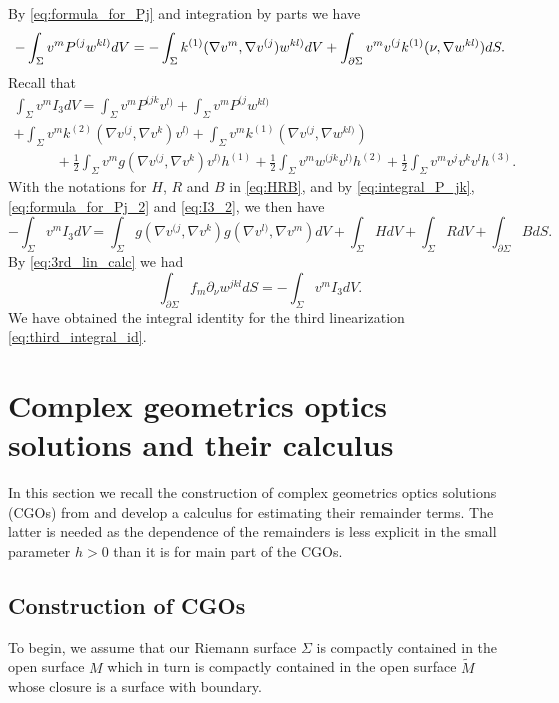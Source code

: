 \documentclass[12pt]{amsart}
\def\p{\partial}
\theoremstyle{definition}
\theoremstyle{remark}
\begin{document}
By \eqref{eq:formula_for_Pj} and integration by parts we have
\begin{equation}\label{eq:formula_for_Pj_2}
 -\int_\Sigma v^m P^{(j}w^{kl)}dV
 =-\int_\Sigma k^{(1)}(\nabla v^m,\nabla v^{(j})w^{kl)}dV \\
 + \int_{\p \Sigma} v^mv^{(j} k^{(1)}(\nu,\nabla w^{kl)})dS.%
\end{equation}
Recall that
\begin{multline}\label{eq:I3_2}
   \int_\Sigma v^m I_3dV= \int_\Sigma v^mP^{(jk}v^{l)}+\int_\Sigma v^m P^{(j}w^{kl)} \\
 	+\int_\Sigma v^mk^{(2)}(\nabla v^{(j},\nabla v^{k})v^{l)}+\int_\Sigma v^mk^{(1)}(\nabla v^{(j},\nabla w^{kl)}) \\
   \qquad\quad+\frac{1}{2}\int_\Sigma v^mg(\nabla v^{(j},\nabla v^{k})v^{l)}h^{(1)} +\frac{1}{2}\int_\Sigma v^mw^{(jk}v^{l)}h^{(2)}+\frac{1}{2}\int_\Sigma v^mv^{j}v^{k}v^{l}h^{(3)}.
\end{multline}
With the notations for $H$, $R$ and $B$ in \eqref{eq:HRB}, and by \eqref{eq:integral_P_jk}, \eqref{eq:formula_for_Pj_2}  and  \eqref{eq:I3_2}, we then have 
\[
 -\int_\Sigma v^m I_3dV=\int_{\Sigma}g(\nabla v^{(j},\nabla v^k)g(\nabla v^{l)},\nabla v^m) dV+\int_\Sigma H dV+\int_\Sigma R dV+\int_{\p \Sigma} B dS.
\]
By \eqref{eq:3rd_lin_calc} we had 
\begin{equation*}
 \int_{\p \Sigma}f_m\p_\nu w^{jkl}dS=-\int_\Sigma v^m I_3dV.
\end{equation*}
We have obtained the integral identity for the third linearization \eqref{eq:third_integral_id}.


\section{Complex geometrics optics solutions and their calculus}\label{sec:CGOs}
In this section we recall the construction of complex geometrics optics solutions (CGOs) from \cite{guillarmou2011identification} and develop a calculus for estimating their remainder terms. The latter is needed as the dependence of the remainders is less explicit in the small parameter $h>0$ than it is for main part of the CGOs.
\subsection{Construction of CGOs}

To begin, we assume that our Riemann surface $\Sigma$ is compactly contained in the open surface $M$ which in turn is compactly contained in the open surface $\widetilde M$ whose closure is a surface with boundary. %
\end{document}
